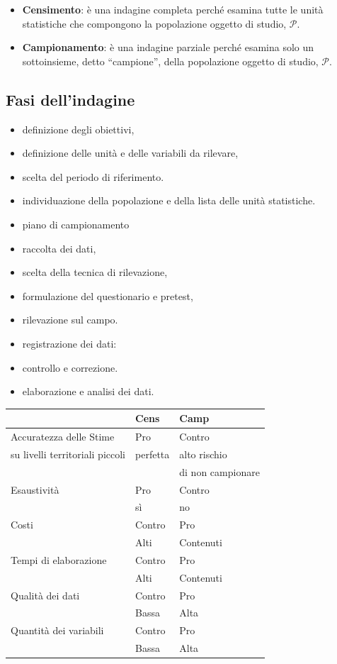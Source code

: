 \documentclass[
  11pt,
]{book}
\providecommand{\tightlist}{%
  \setlength{\itemsep}{0pt}\setlength{\parskip}{0pt}}
\theoremstyle{mytheoremstyle}
\theoremstyle{mydefstyle}
\begin{document}
\begin{itemize}
\tightlist
\item
  \textbf{Censimento}: è una indagine completa perché esamina tutte le unità statistiche che compongono la popolazione oggetto di studio, \(\mathscr{P}\).
\item
  \textbf{Campionamento}: è una indagine parziale perché esamina solo un sottoinsieme, detto ``campione'', della popolazione oggetto di studio, \(\mathscr{P}\).
\end{itemize}

\subsection{Fasi dell'indagine}\label{fasi-dellindagine}

\begin{itemize}
\tightlist
\item
  definizione degli obiettivi,
\item
  definizione delle unità e delle variabili da rilevare,
\item
  scelta del periodo di riferimento.
\item
  individuazione della popolazione e della lista delle unità statistiche.
\item
  piano di campionamento
\item
  raccolta dei dati,
\item
  scelta della tecnica di rilevazione,
\item
  formulazione del questionario e pretest,
\item
  rilevazione sul campo.
\item
  registrazione dei dati:
\item
  controllo e correzione.
\item
  elaborazione e analisi dei dati.
\end{itemize}

\begin{longtable}[]{@{}lll@{}}
\toprule\noalign{}
\(\phantom{a}\) & Cens & Camp \\
\midrule\noalign{}
\endhead
\bottomrule\noalign{}
\endlastfoot
Accuratezza delle Stime & Pro & Contro \\
su livelli territoriali piccoli & perfetta & alto rischio \\
& & di non campionare \\
Esaustività & Pro & Contro \\
& sì & no \\
Costi & Contro & Pro \\
& Alti & Contenuti \\
Tempi di elaborazione & Contro & Pro \\
& Alti & Contenuti \\
Qualità dei dati & Contro & Pro \\
& Bassa & Alta \\
Quantità dei variabili & Contro & Pro \\
& Bassa & Alta \\
\end{longtable}
\end{document}

